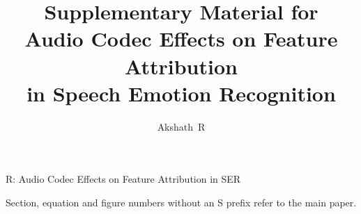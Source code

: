 \documentclass[lettersize,journal]{IEEEtran}
\begin{document}
\title{Supplementary Material for\\
Audio Codec Effects on Feature Attribution\\
in Speech Emotion Recognition}
\author{Akshath~R}
%
{R: Audio Codec Effects on Feature Attribution in SER}
\maketitle

Section, equation and figure numbers without an S prefix refer to the main
paper.



\end{document}
